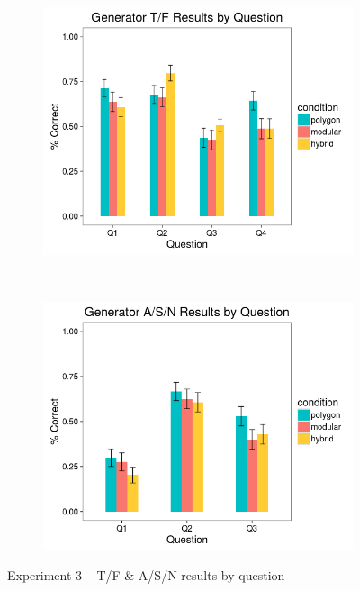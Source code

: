 \documentclass[man,10pt]{apa6}
\begin{document}
\begin{figure}[H]
\centering
\begin{subfigure}[c]{0.45\textwidth}
\centering
\includegraphics[width=\textwidth]{figures/3/gen_TF_by_Q.png}
\end{subfigure}
~
\begin{subfigure}[c]{0.45\textwidth}
\centering
\includegraphics[width=\textwidth]{figures/3/gen_ASN_by_Q.png}
\end{subfigure}
\caption{Experiment 3 -- T/F \& A/S/N results by question}
\end{figure}\noindent 
\end{document}
